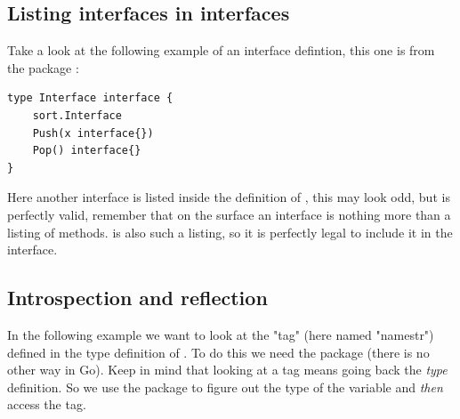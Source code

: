 \subsection{Listing interfaces in interfaces}
Take a look at the following example of an interface defintion, this one is 
from the package :
\begin{lstlisting}
type Interface interface {
    sort.Interface
    Push(x interface{})
    Pop() interface{}
}
\end{lstlisting}
Here another interface is listed inside the definition of , this
may look odd, but is perfectly valid, remember that on the surface an interface is nothing
more than a listing of methods.  is also such a listing, so it is
perfectly legal to include it in the interface.

\subsection{Introspection and reflection}
\label{subsec:introspection and reflection}
In the following example we want to look at the "tag" (here named
"namestr") defined in the
type definition of . To do this we need the
 package (there is no other way in Go). Keep in mind
that looking at a tag means going back the \emph{type} definition. So
we use the  package to figure out the type of the variable
and \emph{then} access the tag.


\showremarks

